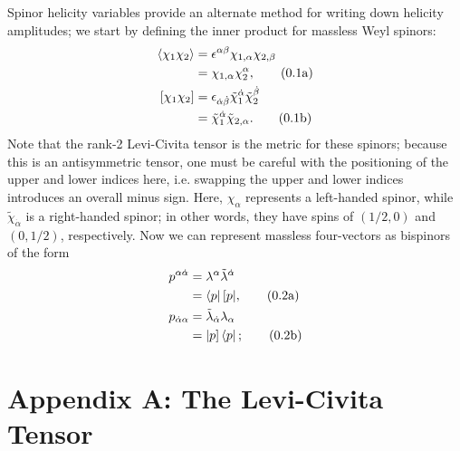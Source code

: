 \documentclass[12pt]{article}
\numberwithin{equation}{section}
\numberwithin{figure}{section}
\numberwithin{table}{section}
\newcommand{\numberthisa}{\addtocounter{equation}{1}\tag{\theequation a}}
\newcommand{\numberthisb}{\addtocounter{equation}{0}\tag{\theequation b}}
\renewcommand{\theequation}{\arabic{section}.\arabic{equation}}
\begin{document}
	Spinor helicity variables provide an alternate method for writing down helicity amplitudes; we start by defining the inner product for massless Weyl spinors:  
	\begin{align*}
	\langle\chi_1\chi_2\rangle & =\epsilon^{\alpha\beta}\chi_{1,\alpha}\chi_{2,\beta}\\
	& =\chi_{1,\alpha}\chi_2^\alpha, \numberthisa\\
	[\chi_1\chi_2] & =\epsilon_{\dot{\alpha}\dot{\beta}}\tilde{\chi}_1^{\dot{\alpha}}\tilde{\chi}_2^{\dot{\beta}}\\
	& =\tilde{\chi}_1^{\dot{\alpha}}\tilde{\chi}_{2,\alpha}. \numberthisb
	\end{align*}
	Note that the rank-2 Levi-Civita tensor is the metric for these spinors; because this is an antisymmetric tensor, one must be careful with the positioning of the upper and lower indices here, i.e. swapping the upper and lower indices introduces an overall minus sign. Here, \(\chi_\alpha\) represents a left-handed spinor, while \(\tilde{\chi}_{\dot{\alpha}}\) is a right-handed spinor; in other words, they have spins of \((1/2,0)\) and \((0,1/2)\), respectively. Now we can represent massless four-vectors as bispinors of the form  
	\begin{align*}
	p^{\alpha\dot{\alpha}} & =\lambda^\alpha\tilde{\lambda}^{\dot{\alpha}}\\
	& =\bra{p}[p|, \numberthisa\\
	p_{\dot{\alpha}\alpha} & =\tilde{\lambda}_{\dot{\alpha}}\lambda_\alpha\\
	& =|p]\bra{p}; \numberthisb
	\end{align*}
	
	\section{Appendix A: The Levi-Civita Tensor}
	
\end{document}

